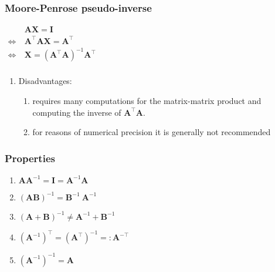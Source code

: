 \subsubsection{Moore-Penrose pseudo-inverse}

$
    \begin{aligned}
                         & \bm{A}\bm{X} = \bm{I} \\
        \Leftrightarrow\ & \bm{A}^\top \bm{A}\bm{X} = \bm{A}^\top \\
        \Leftrightarrow\ & \bm{X} = (\bm{A}^\top \bm{A})^{-1} \bm{A}^\top \\
    \end{aligned}
$
\hfill \cite{mfml/book/mml/Deisenroth-Faisal-Ong}


\vspace{0.2cm}

\begin{enumerate}
    \item Disadvantages:
    \begin{enumerate}
        \item requires many computations for the matrix-matrix product and computing the inverse of $\bm{A}^\top \bm{A}$. 
        \hfill \cite{mfml/book/mml/Deisenroth-Faisal-Ong}

        \item for reasons of numerical precision it is generally not recommended
        \hfill \cite{mfml/book/mml/Deisenroth-Faisal-Ong}
    \end{enumerate}
\end{enumerate}





\subsubsection{Properties}

\begin{multicols}{2}
\begin{enumerate}
    \item $\bm{A}\bm{A}^{-1} = \bm{I} = \bm{A}^{-1}\bm{A}$
    \hfill \cite{mfml/book/mml/Deisenroth-Faisal-Ong}

    \item $(\bm{A}\bm{B})^{-1} = \bm{B}^{-1}\ \bm{A}^{-1}$
    \hfill \cite{mfml/book/mml/Deisenroth-Faisal-Ong}

    \item $(\bm{A} + \bm{B})^{-1} \neq \bm{A}^{-1} + \bm{B}^{-1}$
    \hfill \cite{mfml/book/mml/Deisenroth-Faisal-Ong}

    \item $(\bm{A}^{-1})^\top = (\bm{A}^\top)^{-1} =: \bm{A}^{-\top}$
    \hfill \cite{mfml/book/mml/Deisenroth-Faisal-Ong}

    \item $(\bm{A}^{-1})^{-1} =  \bm{A}$
    
\end{enumerate}
\end{multicols}

